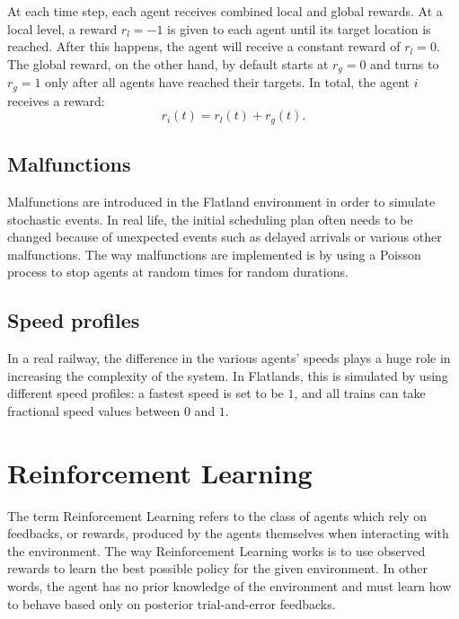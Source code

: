 \documentclass[a4paper, 12pt]{article}
\numberwithin{equation}{section}
\begin{document}
At each time step, each agent receives combined local and global rewards. At a local level, a reward $r_l=-1$ is given to each agent until its target location is reached. After this happens, the agent will receive a constant reward of $r_l=0$. The global reward, on the other hand, by default starts at $r_g=0$ and turns to $r_g=1$ only after all agents have reached their targets. In total, the agent $i$ receives a reward:
\begin{equation}
	r_i\left(t\right)=r_l\left(t\right)+r_g\left(t\right).
\end{equation}




\subsection[Malfunctions]{Malfunctions \cite{malfunctions}}

Malfunctions are introduced in the Flatland environment in order to simulate stochastic events. In real life, the initial scheduling plan often needs to be changed because of unexpected events such as delayed arrivals or various other malfunctions. The way malfunctions are implemented is by using a Poisson process to stop agents at random times for random durations.

\subsection[Speed profiles]{Speed profiles \cite{speeds}}

In a real railway, the difference in the various agents' speeds plays a huge role in increasing the complexity of the system. In Flatlands, this is simulated by using different speed profiles: a fastest speed is set to be $1$, and all trains can take fractional speed values between $0$ and $1$.











\clearpage
\section[Reinforcement Learning]{Reinforcement Learning \cite{reinforcement-learning}}\label{sec:reinforcement-learning}

The term Reinforcement Learning refers to the class of agents which rely on feedbacks, or rewards, produced by the agents themselves when interacting with the environment. The way Reinforcement Learning works is to use observed rewards to learn the best possible policy for the given environment. In other words, the agent has no prior knowledge of the environment and must learn how to behave based only on posterior trial-and-error feedbacks.
\end{document}
